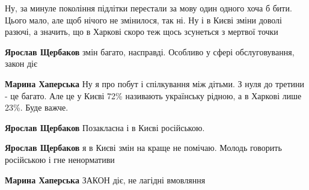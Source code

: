 \begin{itemize}
Ну, за минуле покоління підлітки перестали за мову один одного хоча б бити.
Цього мало, але щоб нічого не змінилося, так ні. Ну і в Києві зміни доволі
разючі, а значить, що в Харкові скоро теж щось зсунеться з мертвої точки

\begin{itemize}
 
\textbf{Ярослав Щербаков} змін багато, насправді. Особливо у сфері обслуговування, закон діє

 
\textbf{Марина Хаперська} Ну я про побут і спілкування між дітьми. З нуля до
третини - це багато. Але це у Києві 72\% називають українську рідною, а в
Харкові лише 23\%. Буде важче.

 
\textbf{Ярослав Щербаков} Позакласна і в Києві російською.

 
\textbf{Ярослав Щербаков} я в Києві змін на краще не помічаю. Молодь говорить російською і гне ненормативи

 
\textbf{Марина Хаперська} ЗАКОН діє, не лагідні вмовляння

 

\end{itemize}
\end{itemize}

